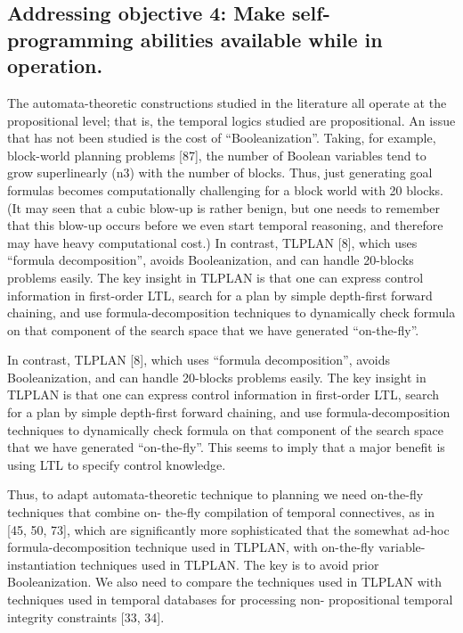 \subsection{Addressing objective 4: Make self-programming abilities available while in operation.} 

The automata-theoretic constructions studied in the literature all operate at the propositional level; that is, the temporal logics studied are propositional. An issue that has not been studied is the cost of “Booleanization”. Taking, for example, block-world planning problems [87], the number of Boolean variables tend to grow superlinearly (n3) with the number of blocks. Thus, just generating goal formulas becomes computationally challenging for a block world with 20 blocks. (It may seen that a cubic blow-up is rather benign, but one needs to remember that this blow-up occurs before we even start temporal reasoning, and therefore may have heavy computational cost.) In contrast, TLPLAN [8], which uses “formula decomposition”, avoids Booleanization, and can handle 20-blocks problems easily. The key insight in TLPLAN is that one can express control information in first-order LTL, search for a plan by simple depth-first forward chaining, and use formula-decomposition techniques to dynamically check formula on that component of the search space that we have generated “on-the-fly”.

In contrast, TLPLAN [8], which uses “formula decomposition”, avoids Booleanization, and can handle 20-blocks problems easily. The key insight in TLPLAN is that one can express control information in first-order LTL, search for a plan by simple depth-first forward chaining, and use formula-decomposition techniques to dynamically check formula on that component of the search space that we have generated “on-the-fly”.
This seems to imply that a major benefit is using LTL to specify control knowledge. 

Thus, to adapt automata-theoretic technique to planning we need on-the-fly techniques that combine on- the-fly compilation of temporal connectives, as in [45, 50, 73], which are significantly more sophisticated that the somewhat ad-hoc formula-decomposition technique used in TLPLAN, with on-the-fly variable- instantiation techniques used in TLPLAN. The key is to avoid prior Booleanization. We also need to compare the techniques used in TLPLAN with techniques used in temporal databases for processing non- propositional temporal integrity constraints [33, 34].


